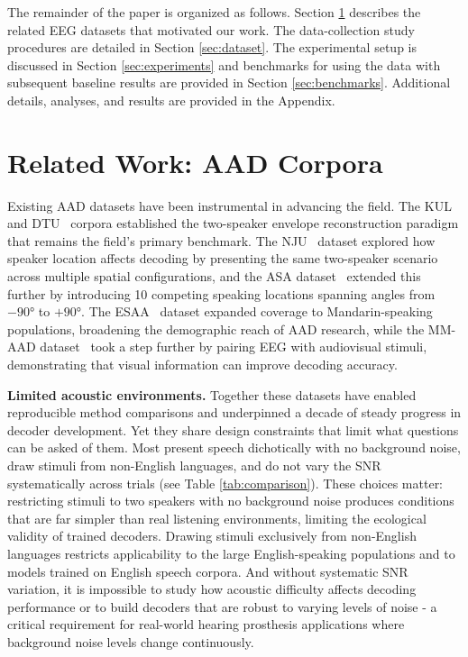 \documentclass{article}
\begin{document}
The remainder of the paper is organized as follows. Section \ref{sec:relatedwork} describes the related EEG datasets that motivated our work. The data-collection study procedures are detailed in Section \ref{sec:dataset}. The experimental setup is discussed in Section \ref{sec:experiments} and benchmarks for using the data with subsequent baseline results are provided in Section \ref{sec:benchmarks}. Additional details, analyses, and results are provided in the Appendix.

\section{Related Work: AAD Corpora}
\label{sec:relatedwork}

Existing AAD datasets have been instrumental in advancing the field. The KUL~\cite{biesmans2016} and DTU~\cite{fuglsang2017} corpora established the two-speaker envelope reconstruction paradigm that remains the field's primary benchmark. The NJU~\cite{nju2023} dataset explored how speaker location affects decoding by presenting the same two-speaker scenario across multiple spatial configurations, and the ASA dataset~\cite{lin2024} extended this further by introducing 10 competing speaking locations spanning angles from $-90°$ to $+90°$. The ESAA~\cite{esaa2022} dataset expanded coverage to Mandarin-speaking populations, broadening the demographic reach of AAD
research, while the MM-AAD dataset~\cite{mmaad2025} took a step further by pairing EEG with audiovisual stimuli, demonstrating that visual information can improve decoding accuracy. 

\textbf{Limited acoustic environments.} Together these datasets have enabled reproducible method comparisons and underpinned a decade of steady progress in decoder development.  Yet they share design constraints that limit what questions can be asked of them. Most present speech dichotically with no background noise, draw stimuli from non-English languages, and do not vary the SNR systematically across trials (see Table \ref{tab:comparison}). These choices matter: restricting stimuli to two speakers with no background noise produces conditions that are far simpler than real listening environments, limiting the ecological validity of trained decoders. Drawing stimuli exclusively from non-English languages restricts applicability to the large English-speaking populations and to models trained on English speech corpora. And without systematic SNR variation, it is impossible to study how acoustic difficulty affects decoding performance or to build decoders that are robust to varying levels of noise - a critical requirement for real-world hearing prosthesis applications where background noise levels change continuously.
\end{document}
